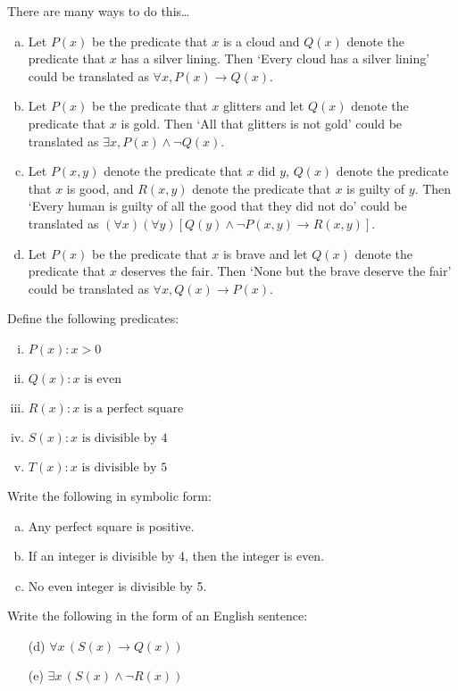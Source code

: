 \documentclass[11pt,letterpaper]{article}
\begin{document}
\sol There are many ways to do this\dots
\begin{enumerate}[(a)]
\item Let $P(x)$ be the predicate that $x$ is a cloud and $Q(x)$ denote the predicate that $x$ has a silver lining. Then `Every cloud has a silver lining' could be translated as $\forall x, P(x) \to Q(x)$. 

\item Let $P(x)$ be the predicate that $x$ glitters and let $Q(x)$ denote the predicate that $x$ is gold. Then `All that glitters is not gold' could be translated as $\exists x, P(x) \wedge \neg Q(x)$. 

\item Let $P(x, y)$ denote the predicate that $x$ did $y$, $Q(x)$ denote the predicate that $x$ is good, and $R(x,y)$ denote the predicate that $x$ is guilty of $y$. Then `Every human is guilty of all the good that they did not do' could be translated as $(\forall x)(\forall y) [ Q(y) \wedge \neg P(x,y) \to R(x,y)]$.

\item Let $P(x)$ be the predicate that $x$ is brave and let $Q(x)$ denote the predicate that $x$ deserves the fair. Then `None but the brave deserve the fair' could be translated as $\forall x, Q(x) \to P(x)$. 
\end{enumerate}





\newpage





 Define the following predicates:
	\begin{enumerate}[(i)]
	\item $P(x) \colon x > 0$
	\item $Q(x) \colon x \text{ is even}$
	\item $R(x) \colon x \text{ is a perfect square}$
	\item $S(x) \colon x \text{ is divisible by }4$
	\item $T(x) \colon x \text{ is divisible by }5$
	\end{enumerate}
Write the following in symbolic form:
	\begin{enumerate}[(a)]
	\item Any perfect square is positive. 
	\item If an integer is divisible by 4, then the integer is even. 
	\item No even integer is divisible by 5. 
	\end{enumerate}
Write the following in the form of an English sentence:
	\begin{enumerate}
	\item[(d)] $\forall x\, (S(x) \to Q(x))$
	\item[(e)] $\exists x\, (S(x) \wedge \neg R(x))$
	\end{enumerate} \pspace
\end{document}
